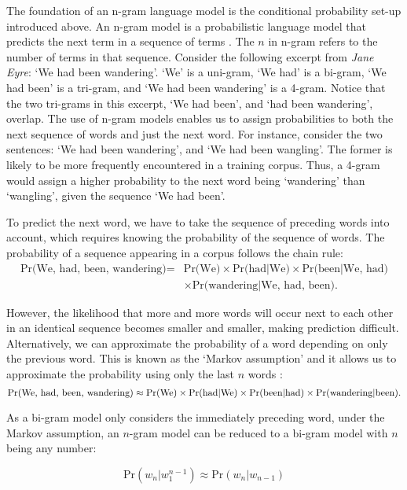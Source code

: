 \documentclass[11pt,]{article}
\begin{document}
The foundation of an n-gram language model is the conditional probability set-up introduced above. An n-gram model is a probabilistic language model that predicts the next term in a sequence of terms \citep{bengio2003neural}. The \(n\) in n-gram refers to the number of terms in that sequence. Consider the following excerpt from \emph{Jane Eyre}: `We had been wandering'. `We' is a uni-gram, `We had' is a bi-gram, `We had been' is a tri-gram, and `We had been wandering' is a 4-gram. Notice that the two tri-grams in this excerpt, `We had been', and `had been wandering', overlap. The use of n-gram models enables us to assign probabilities to both the next sequence of words and just the next word. For instance, consider the two sentences: `We had been wandering', and `We had been wangling'. The former is likely to be more frequently encountered in a training corpus. Thus, a 4-gram would assign a higher probability to the next word being `wandering' than `wangling', given the sequence `We had been'.

To predict the next word, we have to take the sequence of preceding words into account, which requires knowing the probability of the sequence of words. The probability of a sequence appearing in a corpus follows the chain rule:
\begin{align*} 
\mbox{Pr(We, had, been, wandering)} = &  \mbox{Pr(We)} \times  \mbox{Pr(had|We)} \times  \mbox{Pr(been|We, had)} \\ 
 &  \times  \mbox{Pr(wandering|We, had, been)}.
\end{align*}

However, the likelihood that more and more words will occur next to each other in an identical sequence becomes smaller and smaller, making prediction difficult. Alternatively, we can approximate the probability of a word depending on only the previous word. This is known as the `Markov assumption' and it allows us to approximate the probability using only the last \(n\) words \citep{brown1992class}:
\[\mbox{Pr(We, had, been, wandering)} \approx \mbox{Pr(We)} \times \mbox{Pr(had|We)} \times \mbox{Pr(been|had)} \\ 
\times \mbox{Pr(wandering|been)}.\]

As a bi-gram model only considers the immediately preceding word, under the Markov assumption, an \(n\)-gram model can be reduced to a bi-gram model with \(n\) being any number:

\[\mbox{Pr}(w_{n} | w^{n-1}_{1}) \approx \mbox{Pr}(w_{n} | w_{n -1})\]
\end{document}
